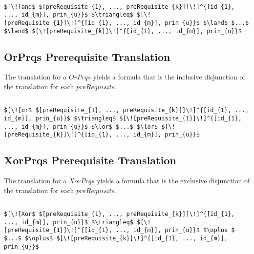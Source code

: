 \lstset{mathescape, language=AST}  
\begin{lstlisting}[frame=single, caption={Prerequisite Translation {$\colon$} Conjunction },label={lst:transpreRequisiteAndPrqs}]

$[\![and$ $[preRequisite_{1}, ..., preRequisite_{k}]]\!]^{[id_{1}, ..., id_{m}], prin_{u}}$ $\triangleq$ $[\![preRequisite_{1}]\!]^{[id_{1}, ..., id_{m}], prin_{u}}$ $\land$ $...$ $\land$ $[\![preRequisite_{k}]\!]^{[id_{1}, ..., id_{m}], prin_{u}}$

\end{lstlisting}

\subsection{OrPrqs Prerequisite Translation}
The translation for a $OrPrqs$ yields a formula that is the inclusive disjunction of the translation for each $preRequisite$.

\lstset{mathescape, language=AST}  
\begin{lstlisting}[frame=single, caption={Prerequisite Translation {$\colon$} Inclusive Disjunction},label={lst:transpreRequisiteOrPrqs}]

$[\![or$ $[preRequisite_{1}, ..., preRequisite_{k}]]\!]^{[id_{1}, ..., id_{m}], prin_{u}}$ $\triangleq$ $[\![preRequisite_{1}]\!]^{[id_{1}, ..., id_{m}], prin_{u}}$ $\lor$ $...$ $\lor$ $[\![preRequisite_{k}]\!]^{[id_{1}, ..., id_{m}], prin_{u}}$

\end{lstlisting}

\subsection{XorPrqs Prerequisite Translation}
The translation for a $XorPrqs$ yields a formula that is the exclusive disjunction of the translation for each $preRequisite$.


\lstset{mathescape, language=AST}  
\begin{lstlisting}[frame=single, caption={Prerequisite Translation {$\colon$} Exclusive Disjunction},label={lst:transpreRequisiteXorPrqs}]

$[\![Xor$ $[preRequisite_{1}, ..., preRequisite_{k}]]\!]^{[id_{1}, ..., id_{m}], prin_{u}}$ $\triangleq$ $[\![preRequisite_{1}]\!]^{[id_{1}, ..., id_{m}], prin_{u}}$ $\oplus $ $...$ $\oplus$ $[\![preRequisite_{k}]\!]^{[id_{1}, ..., id_{m}], prin_{u}}$

\end{lstlisting}



